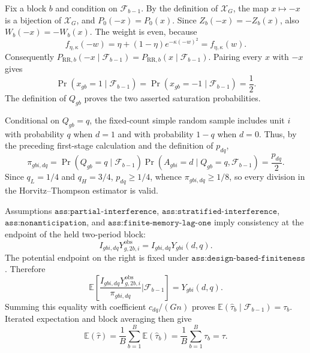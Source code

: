 Fix a block \(b\) and condition on \(\mathcal F_{b-1}\).  By the definition of \(\mathcal X_G\), the map \(x\mapsto-x\) is a bijection of \(\mathcal X_G\), and \(P_0(-x)=P_0(x)\).  Since \(Z_b(-x)=-Z_b(x)\), also \(W_b(-x)=-W_b(x)\).  The weight is even, because
\[
 f_{\eta,\kappa}(-w)=\eta+(1-\eta)e^{-\kappa(-w)^2}=f_{\eta,\kappa}(w).
\]
Consequently \(P_{\mathrm{RR},b}(-x\mid\mathcal F_{b-1})=P_{\mathrm{RR},b}(x\mid\mathcal F_{b-1})\).  Pairing every \(x\) with \(-x\) gives
\[
 \Pr(x_{gb}=1\mid\mathcal F_{b-1})
 =\Pr(x_{gb}=-1\mid\mathcal F_{b-1})=\frac12.
\]
The definition of \(Q_{gb}\) proves the two asserted saturation probabilities.

Conditional on \(Q_{gb}=q\), the fixed-count simple random sample includes unit \(i\) with probability \(q\) when \(d=1\) and with probability \(1-q\) when \(d=0\).  Thus, by the preceding first-stage calculation and the definition of \(p_{dq}\),
\[
 \pi_{gbi,dq}
 =\Pr(Q_{gb}=q\mid\mathcal F_{b-1})
   \Pr(A_{gbi}=d\mid Q_{gb}=q,\mathcal F_{b-1})
 =\frac{p_{dq}}2.
\]
Since \(q_L=1/4\) and \(q_H=3/4\), \(p_{dq}\geq1/4\), whence \(\pi_{gbi,dq}\geq1/8\), so every division in the Horvitz--Thompson estimator is valid.

Assumptions \(\texttt{ass:partial-interference}\), \(\texttt{ass:stratified-interference}\), \(\texttt{ass:nonanticipation}\), and \(\texttt{ass:finite-memory-lag-one}\) imply consistency at the endpoint of the held two-period block:
\[
 I_{gbi,dq}Y^{\mathrm{obs}}_{g,2b,i}
 =I_{gbi,dq}Y_{gbi}(d,q).
\]
The potential endpoint on the right is fixed under \(\texttt{ass:design-based-finiteness}\).  Therefore
\[
 \mathbb E\!\left[
   \frac{I_{gbi,dq}Y^{\mathrm{obs}}_{g,2b,i}}{\pi_{gbi,dq}}
   \mathrel{\bigg|}\mathcal F_{b-1}\right]
 =Y_{gbi}(d,q).
\]
Summing this equality with coefficient \(c_{dq}/(Gn)\) proves
\(\mathbb E(\widehat\tau_b\mid\mathcal F_{b-1})=\tau_b\).  Iterated expectation and block averaging then give
\[
 \mathbb E(\widehat\tau)
 =\frac1B\sum_{b=1}^B\mathbb E(\widehat\tau_b)
 =\frac1B\sum_{b=1}^B\tau_b=\tau.
\]